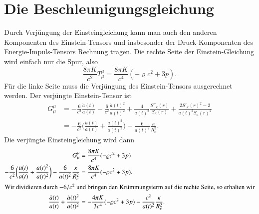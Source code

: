 \section{Die Beschleunigungsgleichung}
Durch Verjüngung der Einsteingleichung kann man auch den anderen
Komponenten des Einstein-Tensors und insbesonder der Druck-Komponenten 
des Energie-Impuls-Tensors Rechnung tragen.
Die rechte Seite der Einstein-Gleichung wird einfach nur die
Spur, also
\[
\frac{8\pi K}{c^2}
T^\mu_\mu = \frac{8\pi K}{c^4}(-\varrho c^2 + 3p).
\]
Für die linke Seite muss die Verjüngung des Einstein-Tensors ausgerechnet
werden.
Der verjüngte Einstein-Tensor ist
\begin{align*}
G^\mu_\mu
&=
- \frac{6}{c^2} \frac{\ddot a(t)}{a(t)}
-\frac{6}{c^2} \frac{\dot a(t)^2}{a(t)^2}
+\frac{4}{a(t)^2} \frac{S''_\kappa(r)}{S_\kappa(r)}
+\frac{2S'_\kappa(r)^2-2}{a(t)^2 S_\kappa(r)^2}
\\
&=
-\frac{6}{c^2}\biggl(\frac{\ddot a(t)}{a(t)} + \frac{\dot a(t)^2}{a(t)^2}\biggr)
-\frac{6}{a(t)^2}\frac{\kappa }{R_c^2}.
\end{align*}
Die verjüngte Einsteingleichung wird dann
\begin{align*}
G^\mu_\mu
&=
\frac{8\pi K}{c^4}(-\varrho  c^2+ 3p)
\\
-\frac{6}{c^2}\biggl(\frac{\ddot a(t)}{a(t)} + \frac{\dot a(t)^2}{a(t)^2}\biggr)
-\frac{6}{a(t)^2}\frac{\kappa }{R_c^2}
&=
\frac{8\pi K}{c^4}(-\varrho c^2 + 3p).
\\
\intertext{Wir dividieren durch $-6/c^2$ und bringen den Krümmungsterm
auf die rechte Seite, so erhalten wir}
\frac{\ddot a(t)}{a(t)} + \frac{\dot a(t)^2}{a(t)^2}
&=
-\frac{4\pi K}{3c^4}(-\varrho c^2 + 3p)
-\frac{c^2}{a(t)^2}\frac{\kappa }{R_c^2}.
\end{align*}
